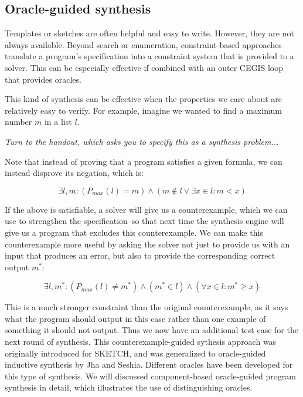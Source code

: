 \documentclass[11pt]{article}
\begin{document}
\subsection{Oracle-guided synthesis}

Templates or sketches are often helpful and easy to write.  However, they are
not always available.  
Beyond search or enumeration, constraint-based approaches translate a program's
specification into a constraint system that is provided to a solver.  This can
be especially effective if combined with an outer CEGIS loop that provides
oracles.  

This kind of synthesis can be effective when the properties we care about are
relatively easy to verify.  For example, imagine we wanted to find a maximum
number $m$ in a list $l$.

\vspace{1em}
\noindent\emph{Turn to the handout, which asks you to specify this as a synthesis problem...}





Note that instead of proving that a program satisfies a given formula, we can
instead disprove its negation, which is: 

\[
\exists l, m : ( P_{max} (l)  = m ) \wedge ( m \notin l \vee \exists x \in l : m <
x)
\]

If the above is satisfiable, a solver will give us a counterexample, which we
can use to strengthen the specification--so that next time the synthesis engine
will give us a program that excludes this counterexample.  We can make this
counterexample more useful by asking the solver not just to provide us with an input
that produces an error, but also to provide the corresponding
correct output $m^*$:

\[
\exists l, m^* : (P_{max}(l) \neq m^* ) \wedge (m^* \in l ) \wedge (\forall x
\in l : m^* \ge x)
\]

This is a much stronger constraint than the original counterexample, as it says
what the program should output in this case rather than one example of something it
should not output.  Thus we now have an additional test case for the next round of
synthesis.  This counterexample-guided sythesis
approach was originally introduced for SKETCH, and was generalized to oracle-guided
inductive synthesis by Jha and Seshia.  Different oracles have been developed
for this type of synthesis.  We will discussed component-based oracle-guided
program synthesis in detail, which illustrates the use of distinguishing
oracles.
\end{document}
